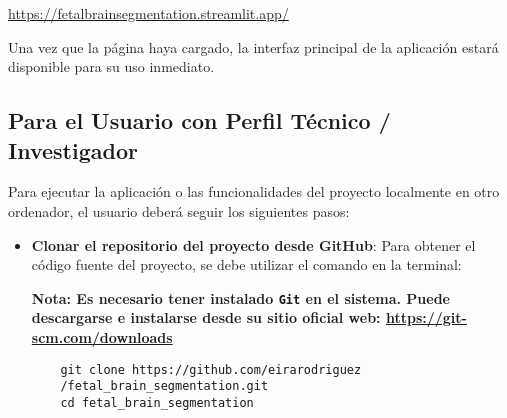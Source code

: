 \begin{center}
\url{https://fetalbrainsegmentation.streamlit.app/} 
\end{center}
 
Una vez que la página haya cargado, la interfaz principal de la aplicación estará disponible para su uso inmediato.
\subsection{Para el Usuario con Perfil Técnico / Investigador}
Para ejecutar la aplicación o las funcionalidades del proyecto localmente en otro ordenador, el usuario deberá seguir los siguientes pasos:
\begin{itemize}
    \item \textbf{Clonar el repositorio del proyecto desde GitHub}: Para obtener el código fuente del proyecto, se debe utilizar el comando en la terminal:
    
    \textbf{Nota: Es necesario tener instalado \texttt{Git} en el sistema. Puede descargarse e instalarse desde su sitio oficial web: \url{https://git-scm.com/downloads}}
    
    \begin{lstlisting}
    git clone https://github.com/eirarodriguez 
    /fetal_brain_segmentation.git
    cd fetal_brain_segmentation
    \end{lstlisting}


\end{itemize}
